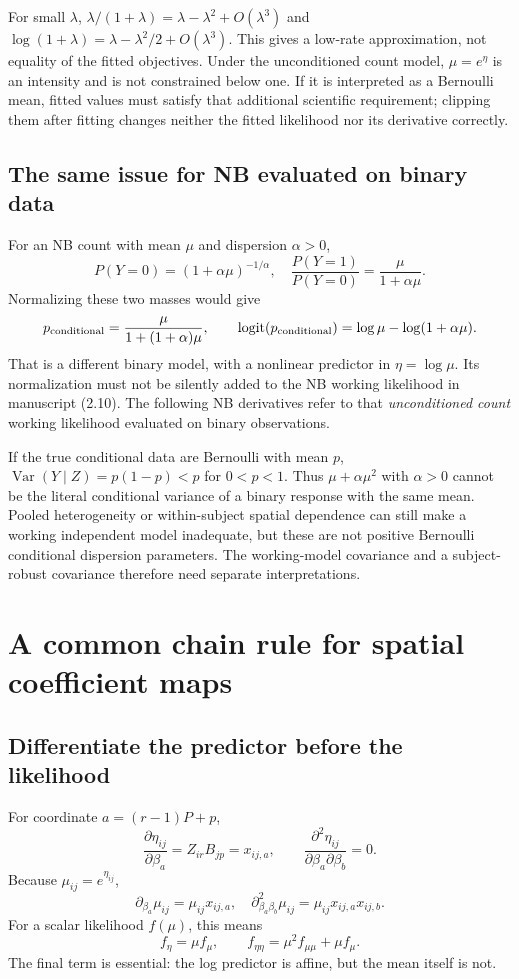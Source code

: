 \documentclass[11pt,a4paper]{article}
\newcommand{\Var}{\operatorname{Var}}
\numberwithin{equation}{section}
\begin{document}
For small $\lambda$,
$\lambda/(1+\lambda)=\lambda-\lambda^2+O(\lambda^3)$ and
$\log(1+\lambda)=\lambda-\lambda^2/2+O(\lambda^3)$.
This gives a low-rate approximation, not equality of the fitted objectives.
Under the unconditioned count model, $\mu=e^\eta$ is an intensity
and is not constrained below one. If it is interpreted as a
Bernoulli mean, fitted values must satisfy that additional scientific
requirement; clipping them after fitting changes neither the fitted
likelihood nor its derivative correctly.

\subsection{The same issue for NB evaluated on binary data}
For an NB count with mean $\mu$ and dispersion $\alpha>0$,
\[
 P(Y=0)=(1+\alpha\mu)^{-1/\alpha},\quad
 \frac{P(Y=1)}{P(Y=0)}=\frac{\mu}{1+\alpha\mu}.
\]
Normalizing these two masses would give
\begin{equation}
 p_{\rm conditional}
 =\frac{\mu}{1+(1+\alpha)\mu},\qquad
 \operatorname{logit}(p_{\rm conditional})
 =\log\mu-\log(1+\alpha\mu).
\end{equation}
That is a different binary model, with a nonlinear predictor in
$\eta=\log\mu$. Its normalization must not be silently added to the
NB working likelihood in manuscript (2.10).
The following NB derivatives refer to that \emph{unconditioned count}
working likelihood evaluated on binary observations.

If the true conditional data are Bernoulli with mean $p$,
$\Var(Y\mid Z)=p(1-p)<p$ for $0<p<1$.
Thus $\mu+\alpha\mu^2$ with $\alpha>0$ cannot be the literal
conditional variance of a binary response with the same mean.
Pooled heterogeneity or within-subject spatial dependence can still
make a working independent model inadequate, but these are not
positive Bernoulli conditional dispersion parameters.
The working-model covariance and a subject-robust covariance therefore
need separate interpretations.

\section{A common chain rule for spatial coefficient maps}
\label{lesion-chain}

\subsection{Differentiate the predictor before the likelihood}
For coordinate $a=(r-1)P+p$,
\[
 \frac{\partial\eta_{ij}}{\partial\beta_a}=Z_{ir}B_{jp}=x_{ij,a},
 \qquad
 \frac{\partial^2\eta_{ij}}{\partial\beta_a\partial\beta_b}=0.
\]
Because $\mu_{ij}=e^{\eta_{ij}}$,
\[
 \partial_{\beta_a}\mu_{ij}=\mu_{ij}x_{ij,a},\quad
 \partial^2_{\beta_a\beta_b}\mu_{ij}=\mu_{ij}x_{ij,a}x_{ij,b}.
\]
For a scalar likelihood $f(\mu)$, this means
\[
 f_{\eta}=\mu f_\mu,\qquad
 f_{\eta\eta}=\mu^2f_{\mu\mu}+\mu f_\mu.
\]
The final term is essential: the log predictor is affine, but
the mean itself is not.
\end{document}
